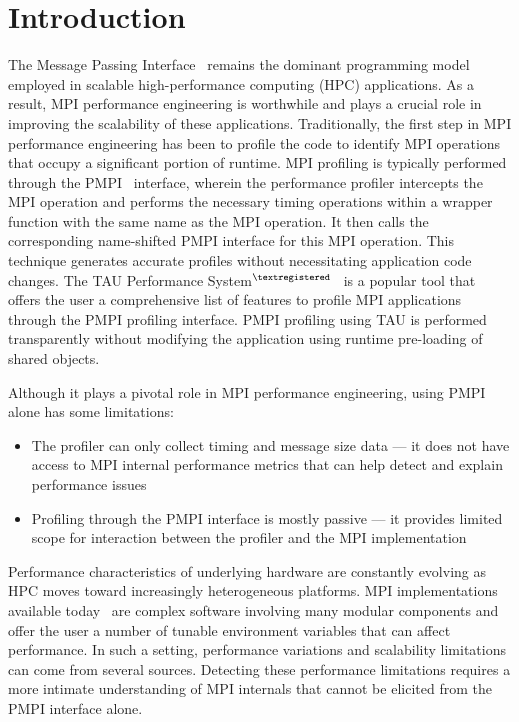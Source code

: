 \chapter{Introduction}

The Message Passing Interface~\cite{MPI_3_1} remains the dominant programming model employed in scalable high-performance computing (HPC) applications. As a result, MPI performance engineering is worthwhile and plays a crucial role in improving the scalability of these applications. Traditionally, the first step in MPI performance engineering has been to profile the code to identify MPI operations that occupy a significant portion of runtime. MPI profiling is typically performed through the PMPI~\cite{PMPI} interface, wherein the performance profiler intercepts the MPI operation and performs the necessary timing operations within a wrapper function with the same name as the MPI operation. It then calls the corresponding name-shifted PMPI interface for this MPI operation. This technique generates accurate profiles without necessitating application code changes. The TAU Performance System$^{\textregistered}$~\cite{Shende:2006:TPP:1125980.1125982} is a popular tool that offers the user a comprehensive list of features to profile MPI applications through the PMPI profiling interface. PMPI profiling using TAU is performed transparently without modifying the application using runtime pre-loading of shared objects. \par
Although it plays a pivotal role in MPI performance engineering, using PMPI alone has some limitations:
\begin{itemize}
\item The profiler can only collect timing and message size data --- it does not have access to MPI internal performance metrics that can help detect and explain performance issues
\item Profiling through the PMPI interface is mostly passive --- it provides limited scope for interaction between the profiler and the MPI implementation
\end{itemize}
\par Performance characteristics of underlying hardware are constantly evolving as HPC moves toward increasingly heterogeneous platforms. MPI implementations available today~\cite{MVAPICH2,OpenMPI,MPICH,pjn2008} are complex software involving many modular components and offer the user a number of tunable environment variables that can affect performance. In such a setting, performance variations and scalability limitations can come from several sources. Detecting these performance limitations requires a more intimate understanding of MPI internals that cannot be elicited from the PMPI interface alone. \par
